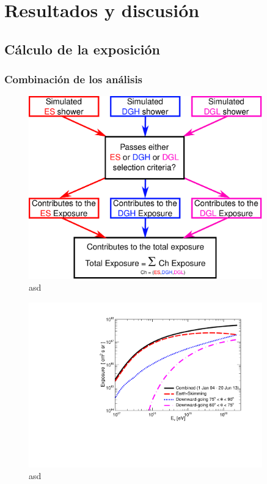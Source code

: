 \chapter{Resultados y discusi\'on}

\section{C\'alculo de la exposici\'on}

	\subsection{Combinaci\'on de los an\'alisis}
	
	\begin{figure}[h!]
		\begin{center}
			\includegraphics[width=0.9\textwidth]{fig/resultadosAuger/sketch_combined_4}
			\caption{asd}
			\label{fig:}
		\end{center}
	\end{figure}
	
	\begin{figure}[h!]
		\begin{center}
			\includegraphics[width=0.9\textwidth]{fig/resultadosAuger/exposure_combined_ageing}
			\caption{asd}
			\label{fig:}
		\end{center}
	\end{figure}

